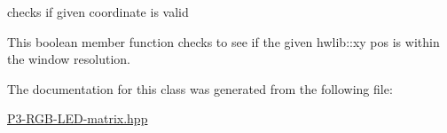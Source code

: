 checks if given coordinate is valid 

This boolean member function checks to see if the given hwlib\+::xy pos is within the window resolution. 

The documentation for this class was generated from the following file\+:\begin{DoxyCompactItemize}
\item 
\hyperlink{P3-RGB-LED-matrix_8hpp}{P3-\/\+R\+G\+B-\/\+L\+E\+D-\/matrix.\+hpp}\end{DoxyCompactItemize}
